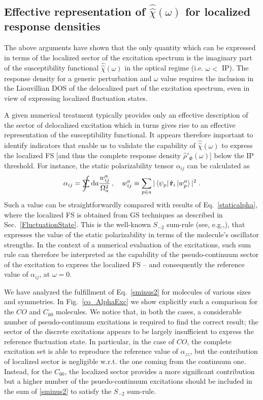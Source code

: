 \documentclass[reprint,aps,prb]{revtex4-1}
\newcommand{\dd}{{\rm d}}
\newcommand{\sint}{\mathrlap{\displaystyle\int}
\mathrlap{\textstyle\sum}
\phantom{\mathrlap{\displaystyle
\int}\textstyle\sum}}
\newcommand{\be}{\begin{equation}}
\newcommand{\ee}{\end{equation}}
\newcommand{\lb}{\label}
\newcommand{\op}[1]{\hat {#1}}
\newcommand{\sop}[1]{\op{\op {#1}}}
\newcommand{\dm}{\op{\rho}}
\begin{document}
\subsection{Effective representation of $\sop \chi(\omega)$ for localized response densities}

The above arguments have shown that the only quantity which can be expressed in terms of the localized sector of the excitation spectrum is the imaginary part of the susceptibility functional $\sop \chi(\omega)$ in the optical regime (i.e. $\omega <$  IP). The response density for a generic perturbation and $\omega$ value requires the inclusion in the Liouvillian DOS of the delocalized part of the excitation spectrum, even in view of expressing localized fluctuation states.

A given numerical treatment typically provides only an effective description of the sector of delocalized excitation which in turns gives rise to an effective
representation of the susceptibility functional. It appears therefore important to identify indicators that enable us to validate the capability
of $\sop \chi(\omega)$ to express the localized FS [and thus the complete response density $\dm'_\Phi(\omega)$] below the IP threshold.
For instance, the static polarizability tensor $\alpha_{ij}$ can be calculated as
\be\lb{sminus2}
\alpha_{ij} = \sint \dd a \frac{w^a_{ij}}{\Omega_a^2}\,, \quad w^a_{ij} \equiv \sum_{p\in a} |\bra{\psi_p} \op {\mathbf r}_i \ket{w_p^a}|^2 \;.
\ee
Such a value can be straightforwardly compared with results of Eq.~\eqref{staticalpha}, where the localized FS is obtained from GS techniques as
described in Sec.~\ref{FluctuationState}.
This is the well-known $S_{-2}$ sum-rule (see, e.g.,\cite{Wagner2012}), that expresses the value of the static polarizability
in terms of the molecule's oscillator strengths.
In the context of a numerical evaluation of the excitations, such sum rule can therefore be interpreted as the capability of the pseudo-continuum sector of the excitation to
express the localized FS -- and consequently the reference value of $\alpha_{ij}$, at $\omega=0$.

We have analyzed the fulfillment of Eq.~\eqref{sminus2} for molecules of various
sizes and symmetries.
In Fig.~\ref{co_AlphaExc} we show explicitly such a comparison for the $CO$ and $C_{60}$ molecules.
We notice that, in both the cases, a considerable number of pseudo-continuum excitations is required
to find the correct result; the sector of the discrete excitations appears to be largely insufficient to express the
reference fluctuation state.
In particular, in the case of $CO$, the complete excitation set is able to reproduce the reference value of $\alpha_{zz}$, but the contribution of localized sector is negligible w.r.t. the one coming from the continuum one. Instead, for the $C_{60}$, the localized sector provides a more significant contribution but a higher number of the psuedo-continuum excitations should be included in the sum of \eqref{sminus2} to satisfy the $S_{-2}$ sum-rule.
\end{document}
